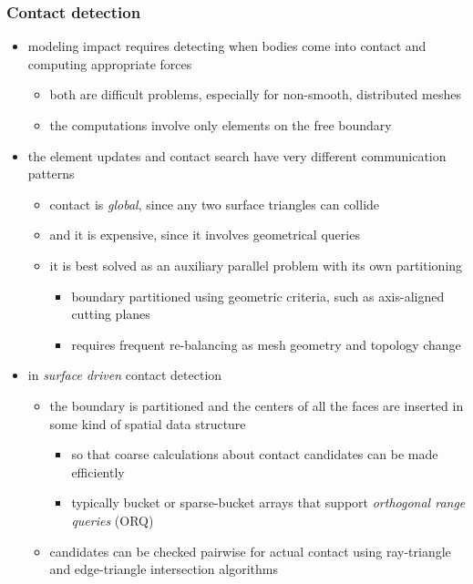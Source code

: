 \begin{frame}[fragile]
%
  \frametitle{Contact detection}
%
  \begin{itemize}
%
  \item modeling impact requires detecting when bodies come into contact and computing
    appropriate forces
    \begin{itemize}
    \item both are difficult problems, especially for non-smooth, distributed meshes
    \item the computations involve only elements on the free boundary
    \end{itemize}
%
  \item the element updates and contact search have very different communication patterns
    \begin{itemize}
    \item contact is {\em global}, since any two surface triangles can collide
    \item and it is expensive, since it involves geometrical queries
    \item it is best solved as an auxiliary parallel problem with its own partitioning
      \begin{itemize}
      \item boundary partitioned using geometric criteria, such as axis-aligned cutting planes
      \item requires frequent re-balancing as mesh geometry and topology change
      \end{itemize}
    \end{itemize}
%
  \item in {\em surface driven} contact detection
    \begin{itemize}
    \item the boundary is partitioned and the centers of all the faces are inserted in some
      kind of spatial data structure
      \begin{itemize}
      \item so that coarse calculations about contact candidates can be made efficiently
      \item typically bucket or sparse-bucket arrays that support {\em orthogonal range
          queries} (ORQ)
      \end{itemize}
    \item candidates can be checked pairwise for actual contact using ray-triangle and
      edge-triangle intersection algorithms
    \end{itemize}
%
  \end{itemize}
%
\end{frame}

